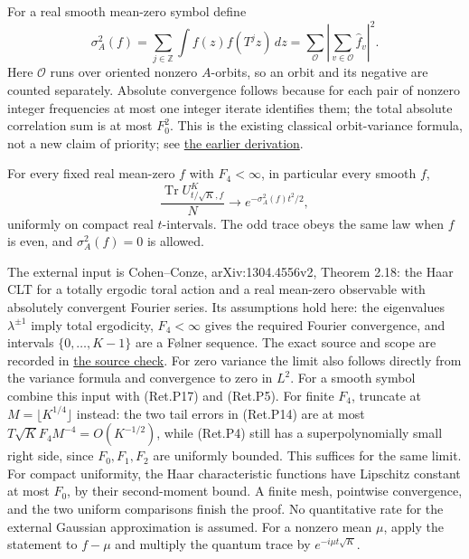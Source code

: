 For a real smooth mean-zero symbol define
\[
 \sigma_A^2(f)=\sum_{j\in\mathbb Z}\int f(z)f(T^jz)\,dz
       =\sum_{\mathcal O}
             \left|\sum_{v\in\mathcal O}\widehat f_v\right|^2. \tag{Ret.P18}
\]
Here \(\mathcal O\) runs over oriented nonzero \(A\)-orbits, so an orbit and
its negative are counted separately. Absolute convergence follows because
for each pair of nonzero integer frequencies at most one integer iterate
identifies them; the total absolute correlation sum is at most \(F_0^2\).
This is the existing classical orbit-variance formula, not a new claim
of priority; see \href{https://github.com/ChurilovMaksim/BGS/blob/main/mathematics/resonance-cohomology/weighted_wiener_resonance.md}{the earlier derivation}.

\begin{theorem}\label{pass1:return_periodic-4} For every fixed real mean-zero
\(f\) with \(F_4<\infty\), in particular every smooth \(f\),
\[
 \frac{\operatorname{Tr}U_{t/\sqrt K,f}^{K}}N
        \longrightarrow e^{-\sigma_A^2(f)t^2/2},            \tag{Ret.P19}
\]
uniformly on compact real \(t\)-intervals. The odd trace obeys the same law
when \(f\) is even, and \(\sigma_A^2(f)=0\) is allowed.
\end{theorem}

The external input is Cohen--Conze, arXiv:1304.4556v2, Theorem 2.18:
the Haar CLT for a totally ergodic toral action and a real mean-zero
observable with absolutely convergent Fourier series. Its assumptions
hold here: the eigenvalues \(\lambda^{\pm1}\) imply total ergodicity,
\(F_4<\infty\) gives the required Fourier convergence, and intervals
\(\{0,\ldots,K-1\}\) are a Følner sequence. The exact source and scope are
recorded in \href{https://github.com/ChurilovMaksim/BGS/blob/main/literature/periodic_return_clt_sources.md}{the source check}.
For zero variance the limit also follows directly from the variance
formula and convergence to zero in \(L^2\).
For a smooth symbol combine this input with (Ret.P17) and (Ret.P5).
For finite \(F_4\), truncate at \(M=\lfloor K^{1/4}\rfloor\) instead:
the two tail errors in (Ret.P14) are at most \(T\sqrt K F_4M^{-4}=O(K^{-1/2})\),
while (Ret.P4) still has a superpolynomially small right side, since
\(F_0,F_1,F_2\) are uniformly bounded. This suffices for the same limit.
For compact uniformity, the Haar characteristic functions have Lipschitz
constant at most \(F_0\), by their second-moment bound. A finite mesh,
pointwise convergence, and the two uniform comparisons finish the proof.
No quantitative rate for the external Gaussian approximation is assumed.
For a nonzero mean \(\mu\), apply the statement to \(f-\mu\) and multiply
the quantum trace by \(e^{-i\mu t\sqrt K}\).

